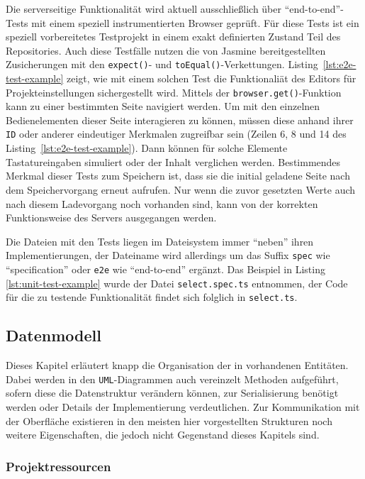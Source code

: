 Die serverseitige Funktionalität wird aktuell ausschließlich über "`end-to-end"'-Tests mit einem speziell instrumentierten Browser geprüft. Für diese Tests ist ein speziell vorbereitetes Testprojekt in einem exakt definierten Zustand Teil des Repositories. Auch diese Testfälle nutzen die von Jasmine bereitgestellten Zusicherungen mit den \texttt{expect()}- und \texttt{toEqual()}-Verkettungen. Listing~\ref{lst:e2e-test-example} zeigt, wie mit einem solchen Test die Funktionaliät des Editors für Projekteinstellungen sichergestellt wird. Mittels der \texttt{browser.get()}-Funktion kann zu einer bestimmten Seite navigiert werden. Um mit den einzelnen Bedienelementen dieser Seite interagieren zu können, müssen diese anhand ihrer \texttt{ID} oder anderer eindeutiger Merkmalen zugreifbar sein (Zeilen 6, 8 und 14 des Listing~\ref{lst:e2e-test-example}). Dann können für solche Elemente Tastatureingaben simuliert oder der Inhalt verglichen werden. Bestimmendes Merkmal dieser Tests zum Speichern ist, dass sie die initial geladene Seite nach dem Speichervorgang erneut aufrufen. Nur wenn die zuvor gesetzten Werte auch nach diesem Ladevorgang noch vorhanden sind, kann von der korrekten Funktionsweise des Servers ausgegangen werden.

Die Dateien mit den Tests liegen im Dateisystem immer "`neben"' ihren Implementierungen, der Dateiname wird allerdings um das Suffix \texttt{spec} wie "`specification"' oder \texttt{e2e} wie "`end-to-end"' ergänzt. Das Beispiel in Listing  \ref{lst:unit-test-example} wurde der Datei \texttt{select.spec.ts} entnommen, der Code für die zu testende Funktionalität findet sich folglich in \texttt{select.ts}.

\subsection{Datenmodell}

Dieses Kapitel erläutert knapp die Organisation der in \idename{} vorhandenen Entitäten. Dabei werden in den \texttt{UML}-Diagrammen auch vereinzelt Methoden aufgeführt, sofern diese die Datenstruktur verändern können, zur Serialisierung benötigt werden oder Details der Implementierung verdeutlichen. Zur Kommunikation mit der Oberfläche existieren in den meisten hier vorgestellten Strukturen noch weitere Eigenschaften, die jedoch nicht Gegenstand dieses Kapitels sind.

\subsubsection{Projektressourcen}

